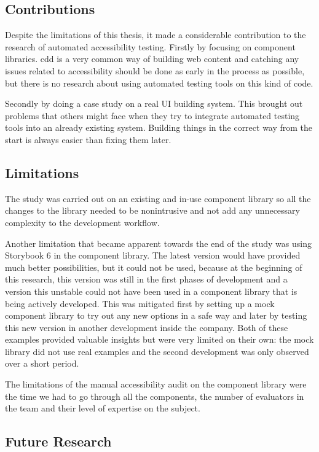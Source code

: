 \documentclass{master_thesis}
\begin{document}
\subsection{Contributions}

Despite the limitations of this thesis, it made a considerable contribution to the research of automated accessibility testing. Firstly by focusing on component libraries. \ac{cdd} is a very common way of building web content and catching any issues related to accessibility should be done as early in the process as possible, but there is no research about using automated testing tools on this kind of code.

Secondly by doing a case study on a real UI building system. This brought out problems that others might face when they try to integrate automated testing tools into an already existing system. Building things in the correct way from the start is always easier than fixing them later.

\subsection{Limitations}

The study was carried out on an existing and in-use component library so all the changes to the library needed to be nonintrusive and not add any unnecessary complexity to the development workflow.

Another limitation that became apparent towards the end of the study was using Storybook 6 in the component library. The latest version would have provided much better possibilities, but it could not be used, because at the beginning of this research, this version was still in the first phases of development and a version this unstable could not have been used in a component library that is being actively developed. This was mitigated first by setting up a mock component library to try out any new options in a safe way and later by testing this new version in another development inside the company. Both of these examples provided valuable insights but were very limited on their own: the mock library did not use real examples and the second development was only observed over a short period.

The limitations of the manual accessibility audit on the component library were the time we had to go through all the components, the number of evaluators in the team and their level of expertise on the subject.

\subsection{Future Research}
\end{document}
